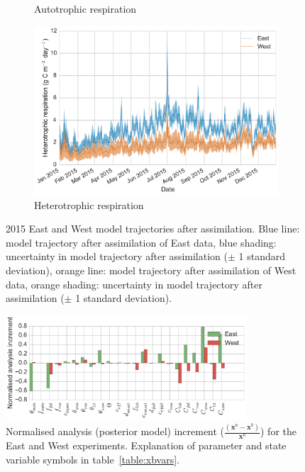 \documentclass[11pt]{article}
\begin{document}
\begin{figure}[ht]
\begin{subfigure}[b]{0.49\textwidth}
        \caption{Autotrophic respiration}
        \label{fig:ra}
    \end{subfigure}
    \begin{subfigure}[b]{0.49\textwidth}
        \includegraphics[width=\textwidth]{rh.pdf}
        \caption{Heterotrophic respiration}
        \label{fig:rh}
    \end{subfigure}
    \caption{2015 East and West model trajectories after assimilation. Blue line: model trajectory after assimilation of East data, blue shading: uncertainty in model trajectory after assimilation (\(\pm\) 1 standard deviation), orange line: model trajectory after assimilation of West data, orange shading: uncertainty in model trajectory after assimilation (\(\pm\) 1 standard deviation).} \label{fig:nee_day}
\end{figure}

\begin{figure}[ht]
    \centering
    \includegraphics[width=0.8\textwidth]{xa_inc.pdf}
    \caption{Normalised analysis (posterior model) increment \big($\frac{(\textbf{x}^a - \textbf{x}^b)}{\textbf{x}^b}$\big) for the East and West experiments. Explanation of parameter and state variable symbols in table~\ref{table:xbvars}.}
    \label{fig:xa_inc}
\end{figure}
\end{document}
